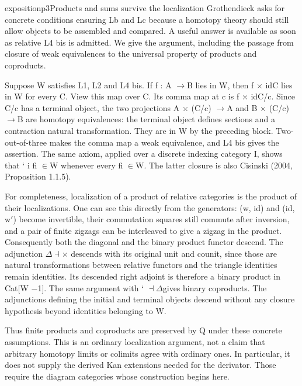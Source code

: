 \noindent{}

\begin{dcomment}{exposition}{p3}{Products and sums survive the localization}
Grothendieck asks for concrete conditions ensuring Lb and Lc because a homotopy theory should still allow objects to be assembled and compared. A useful answer is available as soon as relative L4 bis is admitted. We give the argument, including the passage from closure of weak equivalences to the universal property of products and coproducts.

Suppose W satisfies L1, L2 and L4 bis. If f : A \ensuremath{\to}B lies in W, then f \ensuremath{\times} idC lies in W for every C. View this map over C. Its comma map at c is f \ensuremath{\times} idC/c. Since C/c has a terminal object, the two projections A \ensuremath{\times} (C/c) \ensuremath{\to}A and B \ensuremath{\times} (C/c) \ensuremath{\to}B are homotopy equivalences: the terminal object defines sections and a contraction natural transformation. They are in W by the preceding block. Two-out-of-three makes the comma map a weak equivalence, and L4 bis gives the assertion. The same axiom, applied over a discrete indexing category I, shows that ` i fi \ensuremath{\in}W whenever every fi \ensuremath{\in}W. The latter closure is also Cisinski (2004, Proposition 1.1.5).

For completeness, localization of a product of relative categories is the product of their localizations. One can see this directly from the generators: (w, id) and (id, w\ensuremath{\prime}) become invertible, their commutation squares still commute after inversion, and a pair of finite zigzags can be interleaved to give a zigzag in the product. Consequently both the diagonal and the binary product functor descend. The adjunction \ensuremath{\Delta}\ensuremath{\dashv}\ensuremath{\times} descends with its original unit and counit, since those are natural transformations between relative functors and the triangle identities remain identities. Its descended right adjoint is therefore a binary product in Cat[W \ensuremath{-}1]. The same argument with ` \ensuremath{\dashv}\ensuremath{\Delta}gives binary coproducts. The adjunctions defining the initial and terminal objects descend without any closure hypothesis beyond identities belonging to W.

Thus finite products and coproducts are preserved by Q under these concrete assumptions. This is an ordinary localization argument, not a claim that arbitrary homotopy limits or colimits agree with ordinary ones. In particular, it does not supply the derived Kan extensions needed for the derivator. Those require the diagram categories whose construction begins here.

\end{dcomment}


